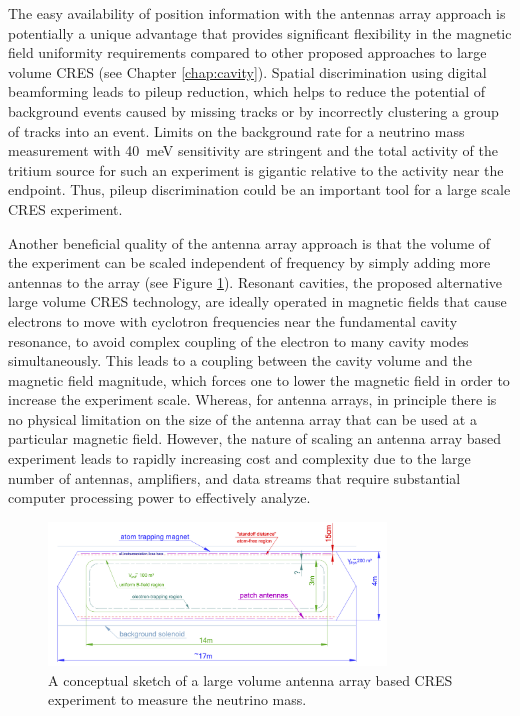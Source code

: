 The easy availability of position information with the antennas array approach is potentially a unique advantage that provides significant flexibility in the magnetic field uniformity requirements compared to other proposed approaches to large volume CRES (see Chapter \ref{chap:cavity}). Spatial discrimination using digital beamforming leads to pileup reduction, which helps to reduce the potential of background events caused by missing tracks or by incorrectly clustering a group of tracks into an event. Limits on the background rate for a neutrino mass measurement with 40~meV sensitivity are stringent and the total activity of the tritium source for such an experiment is gigantic relative to the activity near the endpoint. Thus, pileup discrimination could be an important tool for a large scale CRES experiment.

Another beneficial quality of the antenna array approach is that the volume of the experiment can be scaled independent of frequency by simply adding more antennas to the array (see Figure \ref{fig:chap3-phaseiv-antenna}). Resonant cavities, the proposed alternative large volume CRES technology, are ideally operated in magnetic fields that cause electrons to move with cyclotron frequencies near the fundamental cavity resonance, to avoid complex coupling of the electron to many cavity modes simultaneously. This leads to a coupling between the cavity volume and the magnetic field magnitude, which forces one to lower the magnetic field in order to increase the experiment scale. Whereas, for antenna arrays, in principle there is no physical limitation on the size of the antenna array that can be used at a particular magnetic field. However, the nature of scaling an antenna array based experiment leads to rapidly increasing cost and complexity due to the large number of antennas, amplifiers, and data streams that require substantial computer processing power to effectively analyze.

\begin{figure}[htbp]
    \centering
    \includegraphics*[width=0.8\textwidth]{figs/Chapter-3/phaseiv_concept_sketch_ver2.png}
    \caption{\label{fig:chap3-phaseiv-antenna} A conceptual sketch of a large volume antenna array based CRES experiment to measure the neutrino mass.}
\end{figure}

